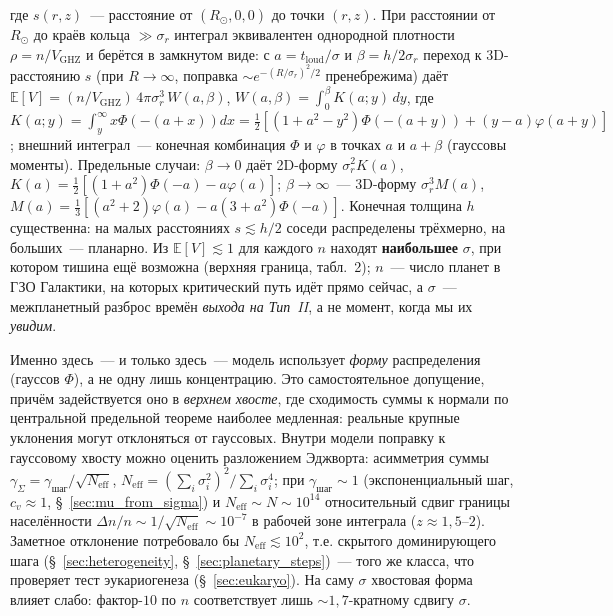 \documentclass[12pt,a4paper]{article}
\begin{document}
где $s(r,z)$~--- расстояние от $(R_\odot,0,0)$ до точки $(r,z)$. При расстоянии от $R_\odot$ до краёв кольца $\gg\sigma_r$ интеграл эквивалентен однородной плотности $\rho=n/V_{\mathrm{GHZ}}$ и берётся в замкнутом виде: с $a=t_{\mathrm{loud}}/\sigma$ и $\beta=h/2\sigma_r$ переход к 3D-расстоянию $s$ (при $R\to\infty$, поправка $\sim e^{-(R/\sigma_r)^2/2}$ пренебрежима) даёт $\mathbb{E}[V]=(n/V_{\mathrm{GHZ}})\,4\pi\sigma_r^3\,W(a,\beta)$, $W(a,\beta)=\int_0^\beta K(a;y)\,dy$, где $K(a;y)=\int_y^\infty x\Phi(-(a+x))dx=\tfrac12[(1+a^2-y^2)\Phi(-(a+y))+(y-a)\varphi(a+y)]$; внешний интеграл~--- конечная комбинация $\Phi$ и $\varphi$ в точках $a$ и $a+\beta$ (гауссовы моменты). Предельные случаи: $\beta\to0$ даёт 2D-форму $\sigma_r^2 K(a)$, $K(a)=\tfrac12[(1+a^2)\Phi(-a)-a\varphi(a)]$; $\beta\to\infty$~--- 3D-форму $\sigma_r^3 M(a)$, $M(a)=\tfrac13[(a^2+2)\varphi(a)-a(3+a^2)\Phi(-a)]$. Конечная толщина $h$ существенна: на малых расстояниях $s \lesssim h/2$ соседи распределены трёхмерно, на больших~--- планарно. Из $\mathbb{E}[V]\lesssim 1$ для каждого $n$ находят \textbf{наибольшее} $\sigma$, при котором тишина ещё возможна (верхняя граница, табл.~2); $n$~--- число планет в ГЗО Галактики, на которых критический путь идёт прямо сейчас, а $\sigma$~--- межпланетный разброс времён \emph{выхода на Тип~II}, а не момент, когда мы их \emph{увидим}.

Именно здесь~--- и только здесь~--- модель использует \emph{форму} распределения (гауссов $\Phi$), а не одну лишь концентрацию. Это самостоятельное допущение, причём задействуется оно в \emph{верхнем хвосте}, где сходимость суммы к нормали по центральной предельной теореме наиболее медленная: реальные крупные уклонения могут отклоняться от гауссовых. Внутри модели поправку к гауссовому хвосту можно оценить разложением Эджворта: асимметрия суммы $\gamma_\Sigma=\gamma_{\text{шаг}}/\sqrt{N_{\mathrm{eff}}}$, $N_{\mathrm{eff}}=(\sum_i\sigma_i^2)^2/\sum_i\sigma_i^4$; при $\gamma_{\text{шаг}}\sim1$ (экспоненциальный шаг, $c_v\approx1$, \S~\ref{sec:mu_from_sigma}) и $N_{\mathrm{eff}}\sim N\sim10^{14}$ относительный сдвиг границы населённости $\Delta n/n\sim1/\sqrt{N_{\mathrm{eff}}}\sim10^{-7}$ в рабочей зоне интеграла ($z\approx1{,}5$--$2$). Заметное отклонение потребовало бы $N_{\mathrm{eff}}\lesssim10^2$, т.е. скрытого доминирующего шага (\S~\ref{sec:heterogeneity}, \S~\ref{sec:planetary_steps})~--- того же класса, что проверяет тест эукариогенеза (\S~\ref{sec:eukaryo}). На саму $\sigma$ хвостовая форма влияет слабо: фактор-$10$ по $n$ соответствует лишь $\sim1{,}7$-кратному сдвигу $\sigma$.
\end{document}
